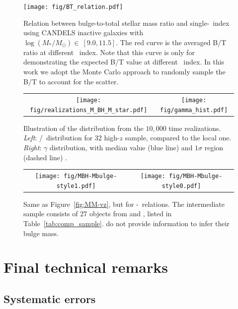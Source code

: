 \documentclass[apj]{emulateapj}
\begin{document}
\begin{figure}
\centering
{
\texttt{[image: fig/BT\_relation.pdf]}
}
\caption{\label{fig:BT-n_relation} 
Relation between bulge-to-total stellar mass ratio and single-\sersic\ index using CANDELS inactive galaxies with $\log (M_*/M_{\odot})\in~[9.0, 11.5]$. The red curve is the averaged B/T ratio at different \sersic\ index. Note that this curve is only for demonstrating the expected B/T value at different \sersic\ index. In this work we adopt the Monte Carlo approach to randomly sample the B/T to account for the scatter.
}
\end{figure} 

\begin{figure}
\centering
\begin{tabular}{c c}
{\texttt{[image: fig/realizations\_M\_BH\_M\_star.pdf]}}&
{\texttt{[image: fig/gamma\_hist.pdf]}}\\
\end{tabular}
\caption{\label{fig:gamma_hist} 
Illustration of the distribution from the $10,000$ time realizations. {\it Left}: \mbh/\smass\ distribution for 32 high-$z$ sample, compared to the local one. {\it Right}: $\gamma$ distribution, with median value (blue line) and $1\sigma$ region (dashed line) .
}
\end{figure}

\begin{figure}
\centering
\begin{tabular}{c c}
{\texttt{[image: fig/MBH-Mbulge-style1.pdf]}}&
{\texttt{[image: fig/MBH-Mbulge-style0.pdf]}}\\
\end{tabular}
\caption{\label{fig:MM_bulge-vz}
Same as Figure~\ref{fig:MM-vz}, but for \mbh-\bmass\ relations. The intermediate sample consists of 27 objects from \citet{Bennert11} and \citet{SS13}, listed in Table~\ref{tab:comp_sample}. \citet{Cisternas2011} do not provide information to infer their bulge mass.}
\end{figure} 


\section{Final technical remarks}
\label{sec:dis}


\subsection{Systematic errors}\label{sec:sysm_err}
\end{document}
